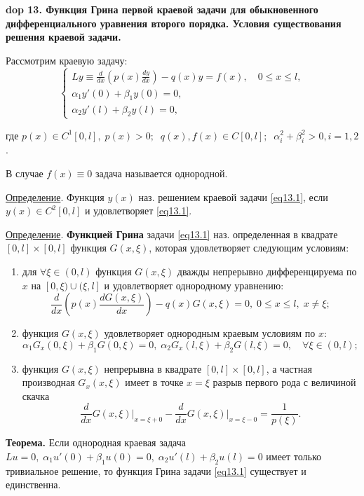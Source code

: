 \setcounter{section}{4}
\setcounter{subsection}{13}
\setcounter{equation}{0}
\textbf{\LARGE dop 13. Функция Грина первой краевой задачи для обыкновенного дифференциального уравнения  второго порядка. Условия существования решения краевой задачи.}

Рассмотрим краевую задачу:
\begin{equation} \label{eq13.1}
\begin{cases}
Ly \equiv \frac{d}{dx} \left ( p(x) \frac{dy}{dx} \right ) - q(x) y = f(x), \quad 0 \leq x \leq l, \\
\alpha_1 y'(0) + \beta_1 y(0) = 0, \\
\alpha_2 y'(l) + \beta_2 y(l) = 0,
\end{cases}
\end{equation}

где $p(x) \in C^1[0,l], \; p(x) > 0; \;\; q(x), f(x) \in C[0,l];\; \; \alpha_i^2 + \beta_i^2 > 0, i = 1, 2$.

В случае $f(x) \equiv 0$ задача называется однородной.

\underline{Определение}. Функция $y(x)$ наз. решением краевой задачи \eqref{eq13.1}, если $y(x) \in C^2[0,l]$ и удовлетворяет \eqref{eq13.1}.

\underline{Определение}. \textbf{Функцией Грина} задачи \eqref{eq13.1} наз. определенная в квадрате $[0,l] \times [0,l]$ функция $G(x, \xi)$, которая удовлетворяет следующим условиям:

\begin{enumerate}
    \item для $\forall \xi \in (0,l)$ функция $G(x, \xi)$ дважды непрерывно дифференцируема по $x$ на $[0, \xi) \cup (\xi, l]$ и удовлетворяет однородному уравнению: $$\frac{d}{dx} \left ( p(x) \frac{d G(x, \xi)}{dx} \right ) - q(x) G(x, \xi) = 0, \; 0 \leq x \leq l, \; x \ne \xi;$$
    \item функция $G(x, \xi)$ удовлетворяет однородным краевым условиям по $x$: $$\alpha_1 G_x(0, \xi) + \beta_1 G(0, \xi) = 0, \; \alpha_2 G_x(l, \xi) + \beta_2 G(l, \xi) = 0, \quad \forall \xi \in (0, l);$$
    \item функция $G(x, \xi)$ непрерывна в квадрате $[0, l] \times [0, l]$, а частная производная $G_x(x, \xi)$ имеет в точке $x = \xi$ разрыв первого рода с величиной скачка $$\frac{d}{dx} G(x, \xi) \big |_{x = \xi + 0} - \frac{d}{dx} G(x, \xi) \big |_{x = \xi - 0} = \frac{1}{p(\xi)}.$$
\end{enumerate}

\textbf{Теорема.} Если однородная краевая задача $L u = 0, \; \alpha_1 u'(0) + \beta_1 u(0) = 0, \; \alpha_2 u'(l) + \beta_2 u(l) = 0$ имеет только тривиальное решение, то функция Грина задачи \eqref{eq13.1} существует и единственна.

